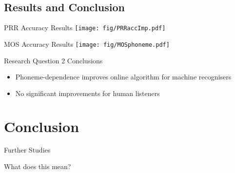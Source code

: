 \subsection{Results and Conclusion}
{\nologo
\begin{frame}{PRR Accuracy Results}
	\centering
	\texttt{[image: fig/PRRaccImp.pdf]}
\end{frame}
\begin{frame}{MOS Accuracy Results}
	\centering
	\texttt{[image: fig/MOSphoneme.pdf]}
\end{frame}
}
\begin{frame}{Research Question 2 Conclusions}
	\begin{itemize}
		\item Phoneme-dependence improves online algorithm for machine recognisers
		\item No significant improvements for human listeners
	\end{itemize}
\end{frame}

\section{Conclusion}

\begin{frame}{Further Studies}
\end{frame}

\begin{frame}{What does this mean?}
\end{frame}